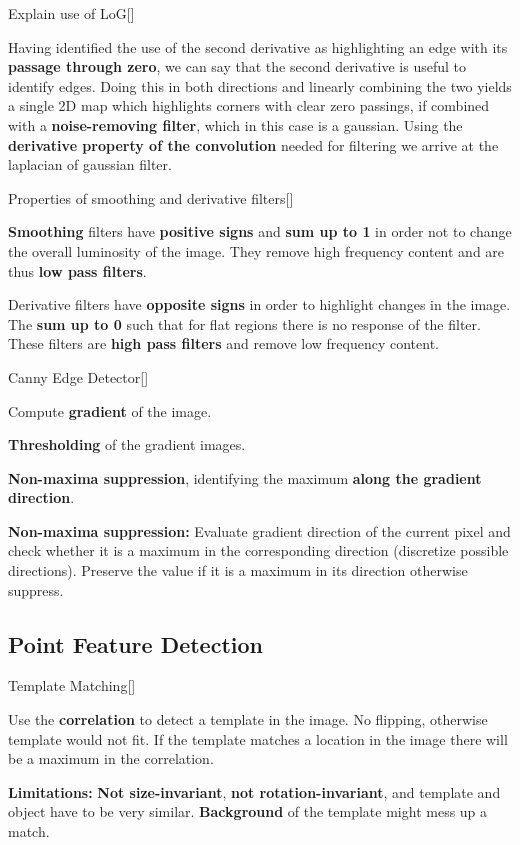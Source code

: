 \documentclass[10pt,a4paper]{scrartcl}
\begin{document}
\begin{multicols*}{2}
\begin{QandA}{Explain use of LoG}[\Application]
\item Having identified the use of the second derivative as highlighting an edge with its \textbf{passage through zero}, we can say that the second derivative is useful to identify edges. Doing this in both directions and linearly combining the two yields a single 2D map which highlights corners with clear zero passings, if combined with a \textbf{noise-removing filter}, which in this case is a gaussian. Using the \textbf{derivative property of the convolution} needed for filtering we arrive at the laplacian of gaussian filter.
\end{QandA}

\begin{QandA}{Properties of smoothing and derivative filters}[\Comparison]
\item \textbf{Smoothing} filters have \textbf{positive signs} and \textbf{sum up to 1} in order not to change the overall luminosity of the image. They remove high frequency content and are thus \textbf{low pass filters}.
\item Derivative filters have \textbf{opposite signs} in order to highlight changes in the image. The \textbf{sum up to 0} such that for flat regions there is no response of the filter. These filters are \textbf{high pass filters} and remove low frequency content.
\end{QandA}

\begin{QandA}{Canny Edge Detector}[\Derivation]
\item Compute \textbf{gradient} of the image.
\item \textbf{Thresholding} of the gradient images.
\item \textbf{Non-maxima suppression}, identifying the maximum \textbf{along the gradient direction}.
\item \textbf{Non-maxima suppression:} Evaluate gradient direction of the current pixel and check whether it is a maximum in the corresponding direction (discretize possible directions). Preserve the value if it is a maximum in its direction otherwise suppress.
\end{QandA}

\subsection*{Point Feature Detection}

\begin{QandA}{Template Matching}[\Definition]
\item Use the \textbf{correlation} to detect a template in the image. No flipping, otherwise template would not fit. If the template matches a location in the image there will be a maximum in the correlation.
\item \textbf{Limitations:} \textbf{Not size-invariant}, \textbf{not rotation-invariant}, and template and object have to be very similar. \textbf{Background} of the template might mess up a match.
\end{QandA}


\end{multicols*}
\end{document}
